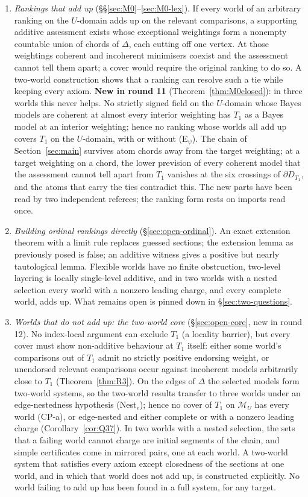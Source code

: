 \documentclass[11pt]{article}
\theoremstyle{definition}
\theoremstyle{remark}
\newcommand{\M}{\mathcal M}
\begin{document}
\begin{enumerate}[leftmargin=*]
\item \emph{Rankings that add up} (\S\S\ref{sec:M0}--\ref{sec:M0-lex}). If every world of an arbitrary ranking on the $U$-domain adds up on the relevant comparisons, a supporting additive assessment exists whose exceptional weightings form a nonempty countable union of chords of $\Delta$, each cutting off one vertex. At those weightings coherent and incoherent minimisers coexist and the assessment cannot tell them apart; a cover would require the original ranking to do so. A two-world construction shows that a ranking can resolve such a tie while keeping every axiom. \textbf{New in round 11} (Theorem~\ref{thm:M0closed}): in three worlds this never helps. No strictly signed field on the $U$-domain whose Bayes models are coherent at almost every interior weighting has $T_1$ as a Bayes model at an interior weighting; hence no ranking whose worlds all add up covers $T_1$ on the $U$-domain, with or without (E$_\psi$). The chain of Section~\ref{sec:main} survives atom chords away from the target weighting; at a target weighting on a chord, the lower prevision of every coherent model that the assessment cannot tell apart from $T_1$ vanishes at the six crossings of $\partial D_{T_1}$, and the atoms that carry the ties contradict this. The new parts have been read by two independent referees; the ranking form rests on imports read once.
\item \emph{Building ordinal rankings directly} (\S\ref{sec:open-ordinal}). An exact extension theorem with a limit rule replaces guessed sections; the extension lemma as previously posed is false; an additive witness gives a positive but nearly tautological lemma. Flexible worlds have no finite obstruction, two-level layering is locally single-level additive, and in two worlds with a nested selection every world with a nonzero leading charge, and every complete world, adds up. What remains open is pinned down in \S\ref{sec:two-questions}.
\item \emph{Worlds that do not add up: the two-world core} (\S\ref{sec:open-core}, new in round 12). No index-local argument can exclude $T_1$ (a locality barrier), but every cover must show non-additive behaviour at $T_1$ itself: either some world's comparisons out of $T_1$ admit no strictly positive endorsing weight, or unendorsed relevant comparisons occur against incoherent models arbitrarily close to $T_1$ (Theorem~\ref{thm:R3}). On the edges of $\Delta$ the selected models form two-world systems, so the two-world results transfer to three worlds under an edge-nestedness hypothesis (Nest$_e$); hence no cover of $T_1$ on $\M_U$ has every world (CP-a), or edge-nested and either complete or with a nonzero leading charge (Corollary~\ref{cor:Q37}). In two worlds with a nested selection, the sets that a failing world cannot charge are initial segments of the chain, and simple certificates come in mirrored pairs, one at each world. A two-world system that satisfies every axiom except closedness of the sections at one world, and in which that world does not add up, is constructed explicitly. No world failing to add up has been found in a full system, for any target.

\end{enumerate}
\end{document}
